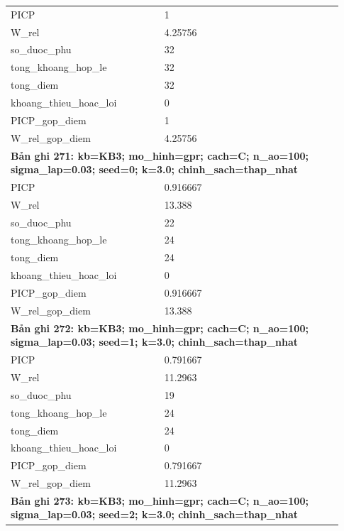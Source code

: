 \begin{longtable}{p{0.43\linewidth}p{0.50\linewidth}}
PICP & 1 \\
W\_\allowbreak rel & 4.25756 \\
so\_\allowbreak duoc\_\allowbreak phu & 32 \\
tong\_\allowbreak khoang\_\allowbreak hop\_\allowbreak le & 32 \\
tong\_\allowbreak diem & 32 \\
khoang\_\allowbreak thieu\_\allowbreak hoac\_\allowbreak loi & 0 \\
PICP\_\allowbreak gop\_\allowbreak diem & 1 \\
W\_\allowbreak rel\_\allowbreak gop\_\allowbreak diem & 4.25756 \\
\midrule
\multicolumn{2}{p{0.95\linewidth}}{\textbf{Bản ghi 271: kb=KB3; mo\_hinh=gpr; cach=C; n\_ao=100; sigma\_lap=0.03; seed=0; k=3.0; chinh\_sach=thap\_nhat}} \\
PICP & 0.916667 \\
W\_\allowbreak rel & 13.388 \\
so\_\allowbreak duoc\_\allowbreak phu & 22 \\
tong\_\allowbreak khoang\_\allowbreak hop\_\allowbreak le & 24 \\
tong\_\allowbreak diem & 24 \\
khoang\_\allowbreak thieu\_\allowbreak hoac\_\allowbreak loi & 0 \\
PICP\_\allowbreak gop\_\allowbreak diem & 0.916667 \\
W\_\allowbreak rel\_\allowbreak gop\_\allowbreak diem & 13.388 \\
\midrule
\multicolumn{2}{p{0.95\linewidth}}{\textbf{Bản ghi 272: kb=KB3; mo\_hinh=gpr; cach=C; n\_ao=100; sigma\_lap=0.03; seed=1; k=3.0; chinh\_sach=thap\_nhat}} \\
PICP & 0.791667 \\
W\_\allowbreak rel & 11.2963 \\
so\_\allowbreak duoc\_\allowbreak phu & 19 \\
tong\_\allowbreak khoang\_\allowbreak hop\_\allowbreak le & 24 \\
tong\_\allowbreak diem & 24 \\
khoang\_\allowbreak thieu\_\allowbreak hoac\_\allowbreak loi & 0 \\
PICP\_\allowbreak gop\_\allowbreak diem & 0.791667 \\
W\_\allowbreak rel\_\allowbreak gop\_\allowbreak diem & 11.2963 \\
\midrule
\multicolumn{2}{p{0.95\linewidth}}{\textbf{Bản ghi 273: kb=KB3; mo\_hinh=gpr; cach=C; n\_ao=100; sigma\_lap=0.03; seed=2; k=3.0; chinh\_sach=thap\_nhat}} \\

\end{longtable}
